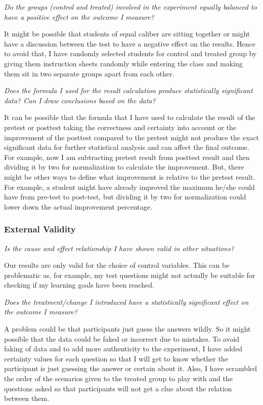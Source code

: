\emph{Do the groups (control and treated) involved in the experiment equally balanced to have a positive effect on the outcome I measure?}

\medskip
\noindent It might be possible that students of equal caliber are sitting together or might have a discussion between the test to have a negative effect on the results. Hence to avoid that, I have randomly selected students for control and treated group by giving them instruction sheets randomly while entering the class and making them sit in two separate groups apart from each other.

\emph{Does the formula I used for the result calculation produce statistically significant data? Can I draw conclusions based on the data?}

\medskip
\noindent It can be possible that the formula that I have used to calculate the result of the pretest or posttest taking the correctness and certainty into account or the improvement of the posttest compared to the pretest might not produce the exact significant data for further statistical analysis and can affect the final outcome. For example, now I am subtracting pretest result from posttest result and then dividing it by two for normalization to calculate the improvement. But, there might be other ways to define what improvement is relative to the pretest result. For example, a student might have already improved the maximum he/she could have from pre-test to post-test, but dividing it by two for normalization could lower down the actual improvement percentage.

\subsubsection{External Validity}\label{subsubsec:externalvalidity}
\emph{Is the cause and effect relationship I have shown valid in other situations?}

\medskip
\noindent Our results are only valid for the choice of control variables.
This can be problematic as, for example, my test questions might not actually be suitable for checking if my learning goals have been reached.

\emph{Does the treatment/change I introduced have a statistically significant effect on the outcome I measure?}

\medskip
\noindent A problem could be that participants just guess the answers wildly. So it might possible that the data could be faked or incorrect due to mistakes. To avoid faking of data and to add more authenticity to the experiment, I have added certainty values for each question so that I will get to know whether the participant is just guessing the answer or certain about it. Also, I have scrambled the order of the scenarios given to the treated group to play with and the questions asked so that participants will not get a clue about the relation between them.

